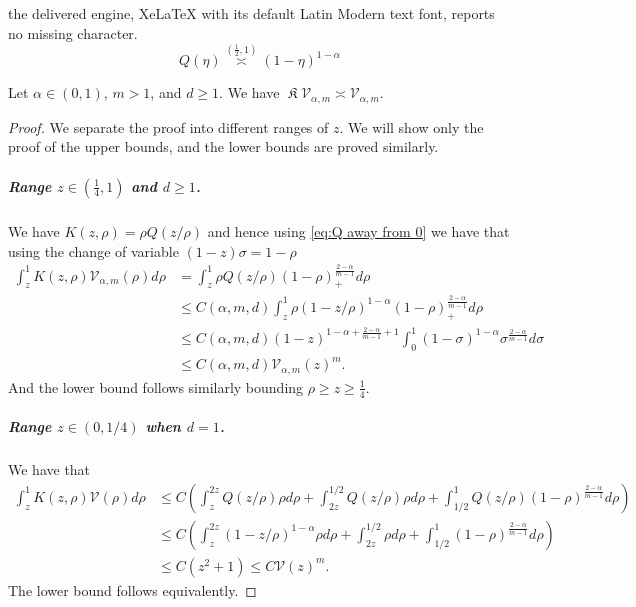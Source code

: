 \documentclass[10pt,a4paper]{amsart}
\DeclareMathOperator{\fixedpoint}{\mathfrak K}
\newcommand{\asympint}[2]{\overset {(#1,#2)}\asymp }
\begin{document}
the delivered engine, XeLaTeX with its default Latin Modern text font, reports no missing character.
\begin{equation}
  \label{eq:Q away from 0}
  Q(\eta) \asympint{\frac{1}{2}}{1} (1 - \eta)^{1-\alpha}
\end{equation}

\begin{lemma}
Let $\alpha \in (0,1)$, $m > 1$, and $d \ge 1$. We have $\fixedpoint \mathcal V_{\alpha,m} \asymp \mathcal V_{\alpha,m}$.
\end{lemma}

\begin{proof}
We separate the proof into different ranges of $z$. We will show only the proof of the upper bounds, and the lower bounds are proved similarly.

\subparagraph{Range $z \in (\frac 1 4,1)$ and $d \ge 1$.}
We have $K(z,\rho) = \rho Q(z/\rho)$ and hence using \eqref{eq:Q away from 0} we have that using the change of variable $(1-z) \sigma = 1-\rho$
\begin{align*}
  \int_z^1 K(z,\rho) \mathcal V_{\alpha,m} (\rho) d \rho
  & =   \int_z^1 \rho Q(z/\rho) (1-\rho)_+^{\frac{2-\alpha}{m-1}} d \rho
  \\
  & \le  C(\alpha,m,d)   \int_z^1 \rho (1-z/\rho)^{1-\alpha} (1-\rho)_+^{\frac{2-\alpha}{m-1}} d \rho
  \\
  & \le  C(\alpha,m,d) (1-z)^{1-\alpha + \frac{2-\alpha}{m-1} + 1} \int_0^1 (1 - \sigma)^{1-\alpha} \sigma^{\frac{2-\alpha}{m-1}} d \sigma
  \\
  & \le {C(\alpha,m,d) } \mathcal V_{\alpha,m}(z)^m.
\end{align*}
And the lower bound follows similarly bounding $\rho \ge z \ge \frac 1 4$.

\subparagraph{Range $z \in (0,1/4)$ when $d = 1$.}
We have that
\begin{align*}
  \int_z^1 K(z,\rho) \mathcal V (\rho) d \rho
  & \le C \left(  \int_z^{2z}  Q(z/ \rho) \rho d \rho + \int_{2z}^{1/2}   Q(z/\rho) \rho d \rho + \int_{1/2}^{1}  Q(z/\rho) (1-\rho)^{\frac{2-\alpha}{m-1}} d \rho
  \right)
  \\
  & \le C\left( \int_z^{2z}  (1 - z/\rho)^{1-\alpha}  \rho d \rho + \int_{2z}^{1/2}\rho d \rho+ \int_{1/2}^{1} (1-\rho)^{\frac{2-\alpha}{m-1}} d \rho
  \right)
  \\
  & \le C \left(
    z^2
  +  1 \right)
  \le C \mathcal V(z)^m.
\end{align*}
The lower bound follows equivalently.


\end{proof}
\end{document}
